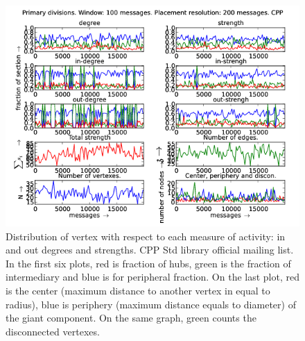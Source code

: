\documentclass[%
 aip,
 jmp,%
 amsmath,amssymb,
 reprint,%
]{revtex4-1}
\begin{document}
\begin{figure}[hbtp] 
   \centering
        \includegraphics[width=\textwidth]{figs/CPP/100}
    \caption{Distribution of vertex with respect to each measure of activity: in and out degrees and strengths. CPP Std library official mailing list. In the first six plots, red is fraction of hubs, green is the fraction of intermediary and blue is for peripheral fraction. On the last plot, red is the center (maximum distance to another vertex in equal to radius), blue is periphery (maximum distance equals to diameter) of the giant component. On the same graph, green counts the disconnected vertexes.}
    \label{fig:cpp100}
\end{figure}
\end{document}
